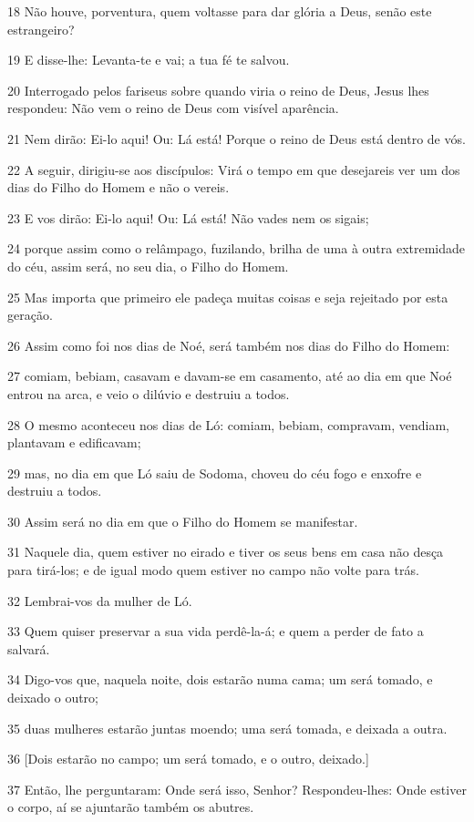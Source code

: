\par 18 Não houve, porventura, quem voltasse para dar glória a Deus, senão este estrangeiro?
\par 19 E disse-lhe: Levanta-te e vai; a tua fé te salvou.
\par 20 Interrogado pelos fariseus sobre quando viria o reino de Deus, Jesus lhes respondeu: Não vem o reino de Deus com visível aparência.
\par 21 Nem dirão: Ei-lo aqui! Ou: Lá está! Porque o reino de Deus está dentro de vós.
\par 22 A seguir, dirigiu-se aos discípulos: Virá o tempo em que desejareis ver um dos dias do Filho do Homem e não o vereis.
\par 23 E vos dirão: Ei-lo aqui! Ou: Lá está! Não vades nem os sigais;
\par 24 porque assim como o relâmpago, fuzilando, brilha de uma à outra extremidade do céu, assim será, no seu dia, o Filho do Homem.
\par 25 Mas importa que primeiro ele padeça muitas coisas e seja rejeitado por esta geração.
\par 26 Assim como foi nos dias de Noé, será também nos dias do Filho do Homem:
\par 27 comiam, bebiam, casavam e davam-se em casamento, até ao dia em que Noé entrou na arca, e veio o dilúvio e destruiu a todos.
\par 28 O mesmo aconteceu nos dias de Ló: comiam, bebiam, compravam, vendiam, plantavam e edificavam;
\par 29 mas, no dia em que Ló saiu de Sodoma, choveu do céu fogo e enxofre e destruiu a todos.
\par 30 Assim será no dia em que o Filho do Homem se manifestar.
\par 31 Naquele dia, quem estiver no eirado e tiver os seus bens em casa não desça para tirá-los; e de igual modo quem estiver no campo não volte para trás.
\par 32 Lembrai-vos da mulher de Ló.
\par 33 Quem quiser preservar a sua vida perdê-la-á; e quem a perder de fato a salvará.
\par 34 Digo-vos que, naquela noite, dois estarão numa cama; um será tomado, e deixado o outro;
\par 35 duas mulheres estarão juntas moendo; uma será tomada, e deixada a outra.
\par 36 [Dois estarão no campo; um será tomado, e o outro, deixado.]
\par 37 Então, lhe perguntaram: Onde será isso, Senhor? Respondeu-lhes: Onde estiver o corpo, aí se ajuntarão também os abutres.

